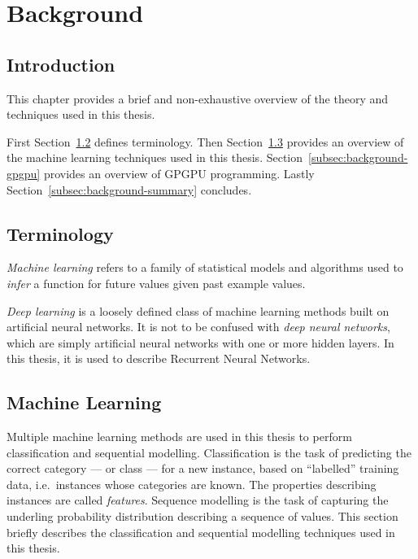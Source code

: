 \chapter{Background}
\label{chap:background}

\section{Introduction}

This chapter provides a brief and non-exhaustive overview of the theory and techniques used in this thesis.

First Section~\ref{subsec:background-terminology} defines terminology. Then Section~\ref{subsec:background-machine-learning} provides an overview of the machine learning techniques used in this thesis. Section~\ref{subsec:background-gpgpu} provides an overview of GPGPU programming. %
Lastly Section~\ref{subsec:background-summary} concludes.


\section{Terminology}
\label{subsec:background-terminology}

\emph{Machine learning} refers to a family of statistical models and algorithms used to \emph{infer} a function for future values given past example values.

\emph{Deep learning} is a loosely defined class of machine learning methods built on artificial neural networks. It is not to be confused with \emph{deep neural networks}, which are simply artificial neural networks with one or more hidden layers. In this thesis, it is used to describe Recurrent Neural Networks.





\section{Machine Learning}
\label{subsec:background-machine-learning}

Multiple machine learning methods are used in this thesis to perform classification and sequential modelling. Classification is the task of predicting the correct category --- or class --- for a new instance, based on ``labelled'' training data, i.e.\ instances whose categories are known. The properties describing instances are called \emph{features}. Sequence modelling is the task of capturing the underling probability distribution describing a sequence of values. This section briefly describes the classification and sequential modelling techniques used in this thesis.


